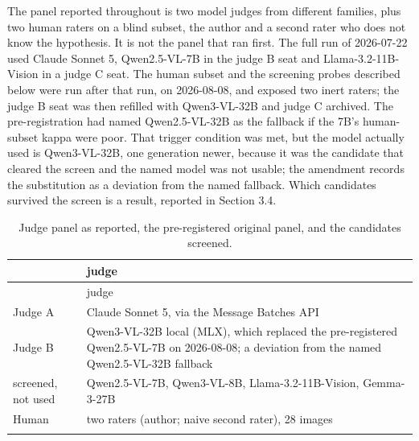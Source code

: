 \documentclass[11pt]{article}
\begin{document}
The panel reported throughout is two model judges from different families, plus
two human raters on a blind subset, the author and a second rater who does not
know the hypothesis. It is not the panel that ran first. The full run of
2026-07-22 used Claude Sonnet 5, Qwen2.5-VL-7B in the judge B seat and
Llama-3.2-11B-Vision in a judge C seat. The human subset and the screening
probes described below were run after that run, on 2026-08-08, and exposed two
inert raters; the judge B seat was then refilled with Qwen3-VL-32B and judge C
archived. The pre-registration had named Qwen2.5-VL-32B as the fallback if the
7B's human-subset kappa were poor. That trigger condition was met, but the model
actually used is Qwen3-VL-32B, one generation newer, because it was the
candidate that cleared the screen and the named model was not usable; the
amendment records the substitution as a deviation from the named fallback. Which
candidates survived the screen is a result, reported in Section 3.4.

\begin{longtable}[]{@{}
  >{\raggedright\arraybackslash}p{}
  >{\raggedright\arraybackslash}p{}@{}}
\caption{Judge panel as reported, the pre-registered original panel, and the
candidates screened.}\tabularnewline
\toprule\noalign{}
\begin{minipage}[b]{\linewidth}\raggedright
\end{minipage} & \begin{minipage}[b]{\linewidth}\raggedright
judge
\end{minipage} \\
\midrule\noalign{}
\endfirsthead
\toprule\noalign{}
\begin{minipage}[b]{\linewidth}\raggedright
\end{minipage} & \begin{minipage}[b]{\linewidth}\raggedright
judge
\end{minipage} \\
\midrule\noalign{}
\endhead
\bottomrule\noalign{}
\endlastfoot
Judge A & Claude Sonnet 5, via the Message Batches API \\*
Judge B & Qwen3-VL-32B local (MLX), which replaced the pre-registered
Qwen2.5-VL-7B on 2026-08-08; a deviation from the named Qwen2.5-VL-32B
fallback \\*
screened, not used & Qwen2.5-VL-7B, Qwen3-VL-8B, Llama-3.2-11B-Vision,
Gemma-3-27B \\*
Human & two raters (author; naive second rater), 28 images \\*
\end{longtable}
\end{document}
